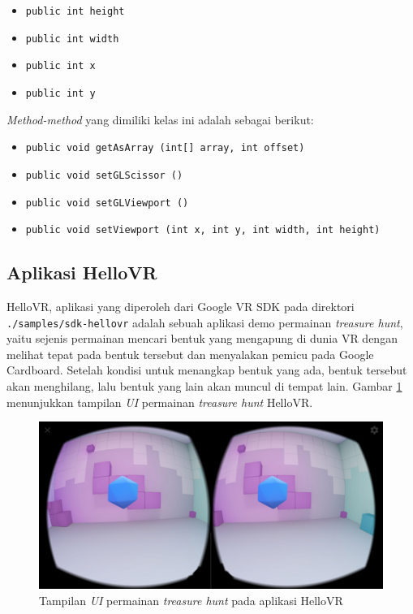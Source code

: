 \begin{enumerate}
		\begin{itemize}
			\item \texttt{public int height}
			
			\item \texttt{public int width}
			
			\item \texttt{public int x}
			
			\item \texttt{public int y}
		\end{itemize}
			
		\textit{Method-method} yang dimiliki kelas ini adalah sebagai berikut:
		
		\begin{itemize}
			\item \texttt{public void getAsArray (int[] array, int offset)}
			
			\item \texttt{public void setGLScissor ()}
			
			\item \texttt{public void setGLViewport ()}
			
			\item \texttt{public void setViewport (int x, int y, int width, int height)}
		\end{itemize}
	\end{enumerate}

\subsection{Aplikasi HelloVR}
\label{subs:hello-vr}
HelloVR, aplikasi yang diperoleh dari Google VR SDK pada direktori \texttt{./samples/sdk-hellovr} adalah sebuah aplikasi demo permainan \textit{treasure hunt}, yaitu sejenis permainan mencari bentuk yang mengapung di dunia VR dengan melihat tepat pada bentuk tersebut dan menyalakan pemicu pada Google Cardboard. Setelah kondisi untuk menangkap bentuk yang ada, bentuk tersebut akan menghilang, lalu bentuk yang lain akan muncul di tempat lain. Gambar \ref{fig:treasure-hunt} menunjukkan tampilan \textit{UI} permainan \textit{treasure hunt} HelloVR. 

\begin{figure}[h]
	\centering
		\includegraphics[width=6in]{Gambar/treasure_hunt.jpg}
	\caption{Tampilan \textit{UI} permainan \textit{treasure hunt} pada aplikasi HelloVR}
	\label{fig:treasure-hunt}
\end{figure}

